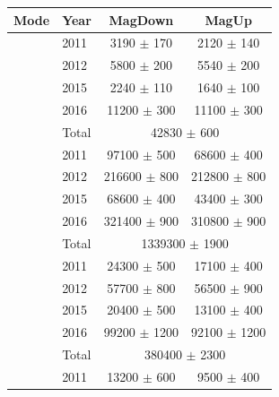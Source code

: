 \begin{table}[!h]
   \begin{center}
      \begin{tabular}{llcc}
         \hline
         Mode                       & Year   & MagDown            & MagUp           \\ 
         \hline                                                
         \decay{\phiz}{\Kp\Km}      & 2011   & 3190 $\pm$ 170     &   2120 $\pm$ 140 \\
                                    & 2012   & 5800 $\pm$ 200     &   5540 $\pm$ 200 \\
                                    & 2015   & 2240 $\pm$ 110     &   1640 $\pm$ 100 \\
                                    & 2016   & 11200 $\pm$ 300    &   11100 $\pm$ 300 \\
                                    & Total  & \multicolumn{2}{c}{42830 $\pm$ 600}\\
         \hline                                                
         \decay{\Dsp}{\Kp\Km\pip}   & 2011   & 97100  $\pm$ 500   & 68600  $\pm$ 400 \\
                                    & 2012   & 216600 $\pm$ 800   & 212800 $\pm$ 800 \\
                                    & 2015   & 68600  $\pm$ 400   & 43400  $\pm$ 300 \\
                                    & 2016   & 321400 $\pm$ 900   & 310800 $\pm$ 900 \\
                                    & Total  & \multicolumn{2}{c}{1339300 $\pm$ 1900}\\
         \hline                                                
         \decay{\Dsp}{\pip\pim\pip} & 2011   & 24300 $\pm$ 500    &   17100 $\pm$ 400 \\
                                    & 2012   & 57700 $\pm$ 800    &   56500 $\pm$ 900 \\
                                    & 2015   & 20400 $\pm$ 500    &   13100 $\pm$ 400 \\
                                    & 2016   & 99200 $\pm$ 1200   &  92100 $\pm$ 1200 \\
                                    & Total  & \multicolumn{2}{c}{380400 $\pm$ 2300}\\
         \hline                                                
         \decay{\Dsp}{\Kp\pim\pip}  & 2011   & 13200 $\pm$ 600    & 9500  $\pm$ 400 \\

\end{tabular}
\end{center}
\end{table}
